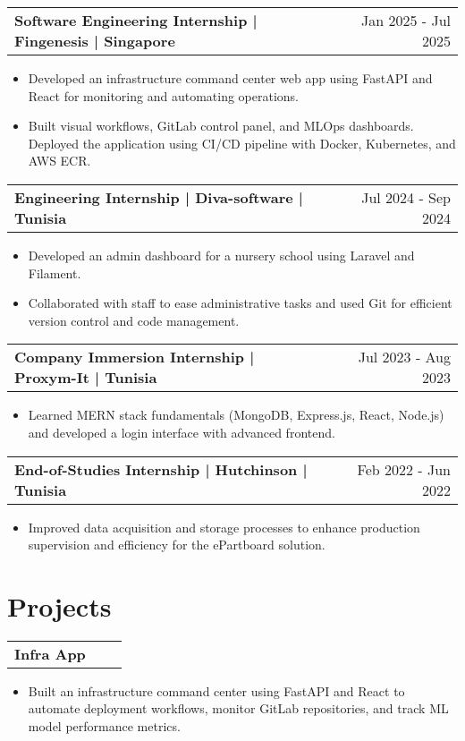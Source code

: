 \documentclass[a4paper,11pt]{article}
\makeatletter
\newenvironment{jobshort}[2]
    {
    \begin{tabularx}{\linewidth}{@{}l X r@{}}
    \textbf{#1} & \hfill &  #2 \\[2.75pt]
    \end{tabularx}
    \begin{minipage}[t]{\linewidth}
    \begin{itemize}[nosep,after=\strut, leftmargin=1em, itemsep=2pt]
    }
    {
    \end{itemize}
    \end{minipage}
    }
\makeatother
\begin{document}
\begin{jobshort}{Software Engineering Internship | Fingenesis | Singapore}{Jan 2025 - Jul 2025}
\item Developed an infrastructure command center web app using FastAPI and React for monitoring and automating operations.
\item Built visual workflows, GitLab control panel, and MLOps dashboards. Deployed the application using CI/CD pipeline with Docker, Kubernetes, and AWS ECR.
\end{jobshort}

\begin{jobshort}{Engineering Internship | Diva-software | Tunisia}{Jul 2024 - Sep 2024}
\item Developed an admin dashboard for a nursery school using Laravel and Filament.
\item Collaborated with staff to ease administrative tasks and used Git for efficient version control and code management.
\end{jobshort}

\begin{jobshort}{Company Immersion Internship | Proxym-It | Tunisia}{Jul 2023 - Aug 2023}
\item Learned MERN stack fundamentals (MongoDB, Express.js, React, Node.js) and developed a login interface with advanced frontend.
\end{jobshort}

\begin{jobshort}{End-of-Studies Internship | Hutchinson | Tunisia}{Feb 2022 - Jun 2022}
\item Improved data acquisition and storage processes to enhance production supervision and efficiency for the ePartboard solution.
\end{jobshort}
  
\section{Projects}

\begin{jobshort}{Infra App}{}
\item Built an infrastructure command center using FastAPI and React to automate deployment workflows, monitor GitLab repositories, and track ML model performance metrics.
\end{jobshort}

\vspace{-4pt}
\end{document}
